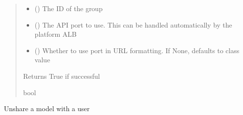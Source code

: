 \documentclass[letterpaper,10pt,english]{sphinxmanual}
\begin{document}
\begin{fulllineitems}
\begin{fulllineitems}
\begin{quote}
\begin{description}
\begin{itemize}
\item {} 
\sphinxAtStartPar
{} () \textendash{} The ID of the group

\item {} 
\sphinxAtStartPar
{} (\sphinxstyleliteralemphasis{\sphinxupquote{ (}}\sphinxstyleliteralemphasis{\sphinxupquote{)}}) \textendash{} The API port to use. This can be handled automatically by the platform ALB

\item {} 
\sphinxAtStartPar
{} (\sphinxstyleliteralemphasis{\sphinxupquote{ (}}\sphinxstyleliteralemphasis{\sphinxupquote{)}}) \textendash{} Whether to use port in URL formatting. If None, defaults to class value

\end{itemize}

\sphinxAtStartPar
{} \textendash{} Returns True if successful

\sphinxAtStartPar
bool

\end{description}\end{quote}

\end{fulllineitems}


\begin{fulllineitems}
\label{\detokenize{aisquared.platform:aisquared.platform.AISquaredPlatformClient.AISquaredPlatformClient.unshare_model_with_user}}
\pysigstartsignatures
{}
\pysigstopsignatures
\sphinxAtStartPar
Unshare a model with a user


\end{fulllineitems}
\end{fulllineitems}
\end{document}
